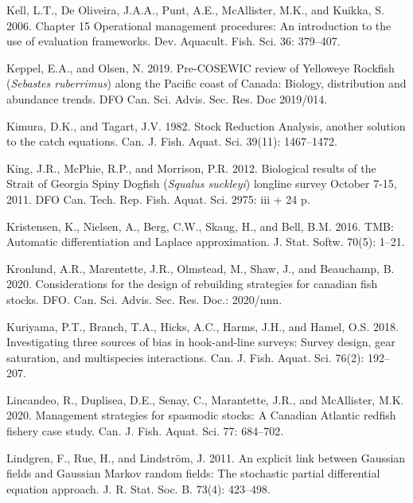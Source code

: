 \documentclass[11pt]{book}
\begin{document}
\leavevmode\hypertarget{ref-kell2006}{}%
Kell, L.T., De Oliveira, J.A.A., Punt, A.E., McAllister, M.K., and Kuikka, S. 2006. Chapter 15 Operational management procedures: An introduction to the use of evaluation frameworks. Dev. Aquacult. Fish. Sci. 36: 379--407.

\leavevmode\hypertarget{ref-keppel2019}{}%
Keppel, E.A., and Olsen, N. 2019. Pre-COSEWIC review of Yelloweye Rockfish (\emph{Sebastes ruberrimus}) along the Pacific coast of Canada: Biology, distribution and abundance trends. DFO Can. Sci. Advis. Sec. Res. Doc 2019/014.

\leavevmode\hypertarget{ref-kimura1982}{}%
Kimura, D.K., and Tagart, J.V. 1982. Stock Reduction Analysis, another solution to the catch equations. Can. J. Fish. Aquat. Sci. 39(11): 1467--1472.

\leavevmode\hypertarget{ref-king2012}{}%
King, J.R., McPhie, R.P., and Morrison, P.R. 2012. Biological results of the Strait of Georgia Spiny Dogfish (\emph{Squalus suckleyi}) longline survey October 7-15, 2011. DFO Can. Tech. Rep. Fish. Aquat. Sci. 2975: iii + 24 p.

\leavevmode\hypertarget{ref-tmb}{}%
Kristensen, K., Nielsen, A., Berg, C.W., Skaug, H., and Bell, B.M. 2016. TMB: Automatic differentiation and Laplace approximation. J. Stat. Softw. 70(5): 1--21.

\leavevmode\hypertarget{ref-kronlund2020}{}%
Kronlund, A.R., Marentette, J.R., Olmstead, M., Shaw, J., and Beauchamp, B. 2020. Considerations for the design of rebuilding strategies for canadian fish stocks. DFO. Can. Sci. Advis. Sec. Res. Doc.: 2020/nnn.

\leavevmode\hypertarget{ref-kuriyama2018}{}%
Kuriyama, P.T., Branch, T.A., Hicks, A.C., Harms, J.H., and Hamel, O.S. 2018. Investigating three sources of bias in hook-and-line surveys: Survey design, gear saturation, and multispecies interactions. Can. J. Fish. Aquat. Sci. 76(2): 192--207.

\leavevmode\hypertarget{ref-lincandeo2020}{}%
Lincandeo, R., Duplisea, D.E., Senay, C., Marantette, J.R., and McAllister, M.K. 2020. Management strategies for spasmodic stocks: A Canadian Atlantic redfish fishery case study. Can. J. Fish. Aquat. Sci. 77: 684--702.

\leavevmode\hypertarget{ref-lindgren2011}{}%
Lindgren, F., Rue, H., and Lindström, J. 2011. An explicit link between Gaussian fields and Gaussian Markov random fields: The stochastic partial differential equation approach. J. R. Stat. Soc. B. 73(4): 423--498.
\end{document}
